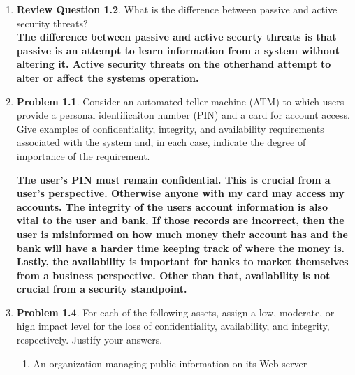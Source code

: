 \documentclass[12pt]{article}
\begin{document}
\renewcommand{\headrulewidth}{0.4pt}

\vspace{-3mm}

\begin{enumerate}

	\item {\textbf{Review Question 1.2}. What is the difference between passive and active security threats?} \\

  \textbf{The difference between passive and active securty threats is that passive is an attempt to learn information from a system without altering it.
  Active security threats on the otherhand attempt to alter or affect the systems operation.}

	\vspace{20pt}


	\item {\textbf{Problem 1.1}. Consider an automated teller machine (ATM) to which users provide a personal identificaiton number (PIN) and a card for account access. Give examples of confidentiality, integrity, and availability requirements associated with the system and, in each case, indicate the degree of importance of the requirement.}

  \textbf{The user's PIN must remain confidential.
  This is crucial from a user's perspective.
  Otherwise anyone with my card may access my accounts.
  The integrity of the users account information is also vital to the user and bank.
  If those records are incorrect, then the user is misinformed on how much money their account has and the bank will have a harder time keeping track of where the money is.
  Lastly, the availability is important for banks to market themselves from a business perspective. Other than that, availability is not crucial from a security standpoint.}
	\vspace{20pt}

	\item {\textbf{Problem 1.4}. For each of the following assets, assign a low, moderate, or high impact level for the loss of confidentiality, availability, and integrity, respectively. Justify your answers.}

	\begin{enumerate}
		\item{An organization managing public information on its Web server}


\end{enumerate}
\end{enumerate}
\end{document}
